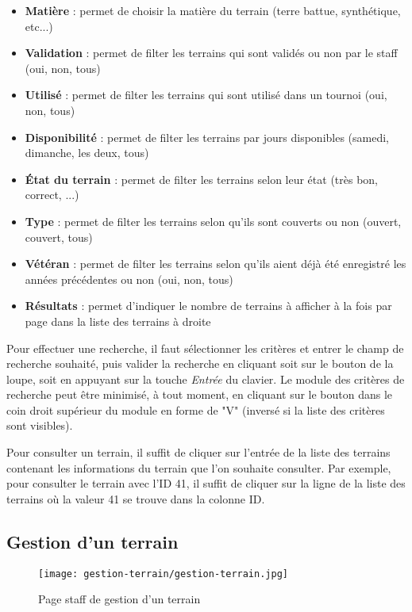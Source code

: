 \begin{itemize}
\item \textbf{Matière} : permet de choisir la matière du terrain (terre battue, synthétique, etc...)
\item \textbf{Validation} : permet de filter les terrains qui sont validés ou non par le staff (oui, non, tous)
\item \textbf{Utilisé} : permet de filter les terrains qui sont utilisé dans un tournoi (oui, non, tous)
\item \textbf{Disponibilité} : permet de filter les terrains par jours disponibles (samedi, dimanche, les deux, tous)
\item \textbf{État du terrain} : permet de filter les terrains selon leur état (très bon, correct, ...)
\item \textbf{Type }: permet de filter les terrains selon qu'ils sont couverts ou non (ouvert, couvert, tous)
\item \textbf{Vétéran} : permet de filter les terrains selon qu'ils aient déjà été enregistré les années précédentes ou non (oui, non, tous)
\item \textbf{Résultats} : permet d'indiquer le nombre de terrains à afficher à la fois par page dans la liste des terrains à droite
\end{itemize}
\bigskip

Pour effectuer une recherche, il faut sélectionner les critères et entrer le champ de recherche souhaité, puis valider la recherche en cliquant soit sur le bouton de la loupe, soit en appuyant sur la touche \textit{Entrée} du clavier. Le module des critères de recherche peut être minimisé, à tout moment, en cliquant sur le bouton dans le coin droit supérieur du module en forme de "V" (inversé si la liste des critères sont visibles).\newline

Pour consulter un terrain, il suffit de cliquer sur l'entrée de la liste des terrains contenant les informations du terrain que l'on souhaite consulter. Par exemple, pour consulter le terrain avec l'ID 41, il suffit de cliquer sur la ligne de la liste des terrains où la valeur 41 se trouve dans la colonne ID.

\subsection{Gestion d'un terrain}

\begin{figure}[H]
\centering
\texttt{[image: gestion-terrain/gestion-terrain.jpg]}
\caption{Page staff de gestion d'un terrain}
\end{figure}

